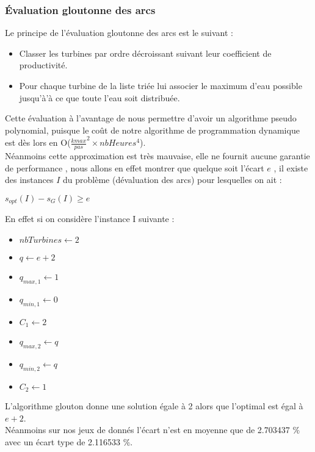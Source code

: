 \documentclass[a4paper]{report}
\begin{document}
\subsubsection*{Évaluation gloutonne des arcs}
Le principe de l'évaluation gloutonne des arcs est le suivant :\\
\begin{itemize}
\item Classer les turbines par ordre décroissant suivant leur coefficient de productivité.

\item Pour chaque turbine de la liste triée lui associer le maximum d'eau possible jusqu’à'à ce que toute l'eau soit distribuée.
\end{itemize}
Cette évaluation à l'avantage de nous permettre d'avoir un algorithme pseudo polynomial, puisque le coût de notre algorithme de programmation dynamique est dès lors en  O($\frac{kmax}{pas}^{2}\times nbHeures^{4}$).\\
Néanmoins cette approximation est très mauvaise, elle ne fournit aucune garantie de performance , nous allons en effet montrer que quelque soit l'écart $e$ , il existe des instances $I$ du problème (dévaluation des arcs) pour lesquelles on ait :\\
\begin{center}
$ s_{opt}(I)-s_{G}(I)\geq e$
\end{center}
En effet si on considère l'instance I suivante :\\
\begin{itemize}
\item $nbTurbines \longleftarrow 2$
\item $q \longleftarrow e+2$
\item $q_{max,1}\longleftarrow1$
\item $q_{min,1}\longleftarrow0$
\item $C_1\longleftarrow 2$
\item $q_{max,2}\longleftarrow q$
\item $q_{min,2}\longleftarrow q$
\item $C_2\longleftarrow 1$
\end{itemize}
L'algorithme glouton donne une solution égale à 2 alors que l'optimal est égal à $e+2$.\\
Néanmoins sur nos jeux de donnés l'écart n'est en moyenne que de 2.703437 $\%$ avec un écart type de 2.116533 $\%$.
\end{document}
